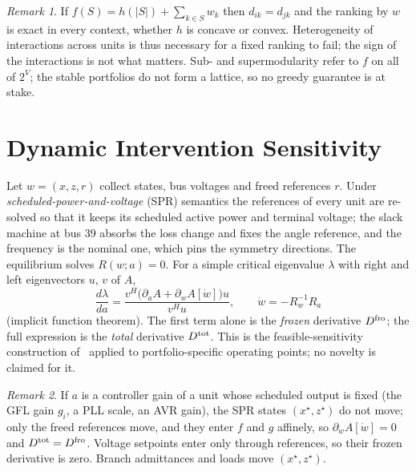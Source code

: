 \documentclass[journal]{IEEEtran}
\theoremstyle{remark}
\newtheorem{remark}{Remark}
\newcommand{\Dtot}{D^{\rm tot}}
\newcommand{\Dfro}{D^{\rm fro}}
\begin{document}
\begin{remark}\label{rem:heter}
If $f(S)=h(|S|)+\sum_{k\in S}w_k$ then $d_{ik}=d_{jk}$ and the ranking by $w$ is
exact in every context, whether $h$ is concave or convex. Heterogeneity of
interactions across units is thus necessary for a fixed ranking to fail; the sign
of the interactions is not what matters. Sub- and supermodularity refer to $f$ on
all of $2^V$; the stable portfolios do not form a lattice, so no greedy guarantee
is at stake.
\end{remark}

\section{Dynamic Intervention Sensitivity}\label{sec:sens}

Let $w=(x,z,r)$ collect states, bus voltages and freed references $r$. Under
\emph{scheduled-power-and-voltage} (SPR) semantics the references of every unit
are re-solved so that it keeps its scheduled active power and terminal voltage;
the slack machine at bus 39 absorbs the loss change and fixes the angle
reference, and the frequency is the nominal one, which pins the symmetry
directions. The equilibrium solves $R(w;a)=0$. For a simple critical eigenvalue
$\lambda$ with right and left eigenvectors $u$, $v$ of $A$,
\begin{equation}\label{eq:tot}
\frac{d\lambda}{da}=\frac{v^{H}\big(\partial_aA+\partial_wA[\dot w]\big)u}{v^Hu},\qquad
\dot w=-R_w^{-1}R_a
\end{equation}
(implicit function theorem). The first term alone is the \emph{frozen}
derivative $\Dfro$; the full expression is the \emph{total} derivative $\Dtot$.
This is the feasible-sensitivity construction of~\cite{smed1993feasible,nam2000eigsens}
applied to portfolio-specific operating points; no novelty is claimed for it.

\begin{remark}
If $a$ is a controller gain of a unit whose scheduled output is fixed (the GFL
gain $g_i$, a PLL scale, an AVR gain), the SPR states $(x^\star,z^\star)$ do not
move; only the freed references move, and they enter $f$ and $g$ affinely, so
$\partial_wA[\dot w]=0$ and $\Dtot=\Dfro$. Voltage setpoints enter only through
references, so their frozen derivative is zero. Branch admittances and loads move
$(x^\star,z^\star)$.
\end{remark}
\end{document}
